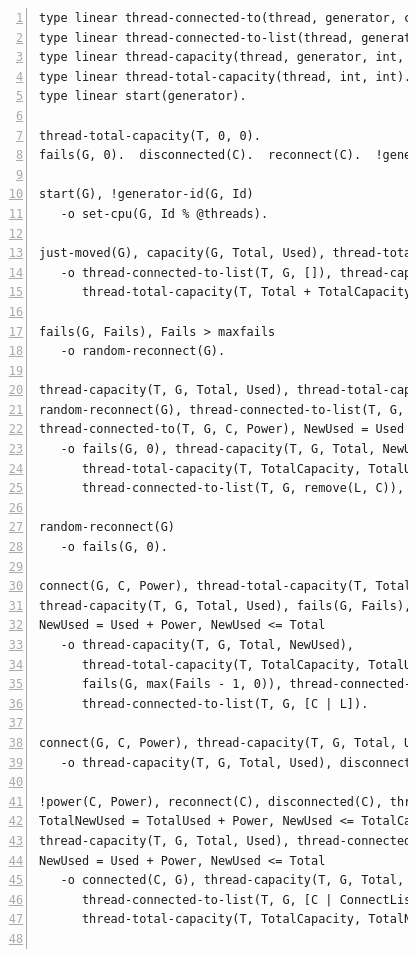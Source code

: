 \begin{figure}[h!]
\begin{Verbatim}[numbers=left,fontsize=\scriptsize,commandchars=*\#\&]
type linear thread-connected-to(thread, generator, consumer, int).
type linear thread-connected-to-list(thread, generator, list consumer).
type linear thread-capacity(thread, generator, int, int).
type linear thread-total-capacity(thread, int, int).
type linear start(generator).

thread-total-capacity(T, 0, 0).
fails(G, 0).  disconnected(C).  reconnect(C).  !generators(C, all-generators).  start(G).

start(G), !generator-id(G, Id)
   -o set-cpu(G, Id % @threads).

just-moved(G), capacity(G, Total, Used), thread-total-capacity(T, TotalCapacity, TotalUsed)
   -o thread-connected-to-list(T, G, []), thread-capacity(T, G, Total, Used),
      thread-total-capacity(T, Total + TotalCapacity, Used + TotalUsed).

fails(G, Fails), Fails > maxfails
   -o random-reconnect(G).

thread-capacity(T, G, Total, Used), thread-total-capacity(T, TotalCapacity, TotalUsed),
random-reconnect(G), thread-connected-to-list(T, G, L), L <> [], C = nth(L, randint(length(L))),
thread-connected-to(T, G, C, Power), NewUsed = Used - Power
   -o fails(G, 0), thread-capacity(T, G, Total, NewUsed),
      thread-total-capacity(T, TotalCapacity, TotalUsed - Power),
      thread-connected-to-list(T, G, remove(L, C)), disconnect(C, G).

random-reconnect(G)
   -o fails(G, 0).

connect(G, C, Power), thread-total-capacity(T, TotalCapacity, TotalUsed),
thread-capacity(T, G, Total, Used), fails(G, Fails), thread-connected-to-list(T, G, L),
NewUsed = Used + Power, NewUsed <= Total
   -o thread-capacity(T, G, Total, NewUsed),
      thread-total-capacity(T, TotalCapacity, TotalUsed + Power),
      fails(G, max(Fails - 1, 0)), thread-connected-to(T, G, C, Power),
      thread-connected-to-list(T, G, [C | L]).

connect(G, C, Power), thread-capacity(T, G, Total, Used), Used + Power > Total, fails(G, Fails)
   -o thread-capacity(T, G, Total, Used), disconnect(C, G), fails(G, Fails + 1).

!power(C, Power), reconnect(C), disconnected(C), thread-total-capacity(T, TotalCapacity, TotalUsed),
TotalNewUsed = TotalUsed + Power, NewUsed <= TotalCapacity,
thread-capacity(T, G, Total, Used), thread-connected-to-list(T, G, ConnectList),
NewUsed = Used + Power, NewUsed <= Total
   -o connected(C, G), thread-capacity(T, G, Total, NewUsed),
      thread-connected-to-list(T, G, [C | ConnectList]), thread-connected-to(T, G, C, Power),
      thread-total-capacity(T, TotalCapacity, TotalNewUsed).


\end{Verbatim}
\end{figure}
